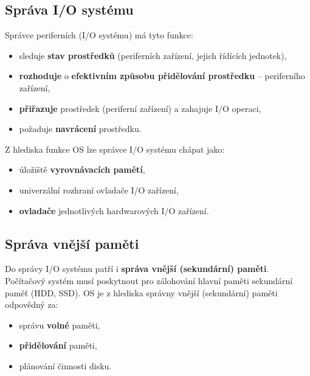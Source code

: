 \subsection{Správa I/O systému}
Správce periferních (I/O systému) má tyto funkce:
\begin{itemize}
    \item sleduje \textbf{stav prostředků }(periferních zařízení, jejich řídících jednotek),
    \item \textbf{rozhoduje} o\textbf{ efektivním způsobu přidělování prostředku} -- periferního zařízení,
    \item \textbf{přiřazuje} prostředek (periferní zařízení) a zahajuje I/O operaci,
    \item požaduje \textbf{navrácení} prostředku.
\end{itemize}
Z hlediska funkce OS lze správce I/O systému chápat jako:
\begin{itemize}
    \item úložiště \textbf{vyrovnávacích pamětí},
    \item univerzální rozhraní ovladače I/O zařízení,
    \item \textbf{ovladače} jednotlivých hardwarových I/O zařízení.
\end{itemize}

\subsection{Správa vnější paměti}
Do správy I/O systému patří i \textbf{správa vnější (sekundární) paměti}. Počítačový systém musí poskytnout pro zálohování hlavní paměti sekundární paměť (HDD, SSD). OS je z hlediska správny vnější (sekundární) paměti odpovědný za:
\begin{itemize}
    \item správu \textbf{volné} paměti,
    \item \textbf{přidělování} paměti,
    \item plánování činnosti disku.
\end{itemize}

